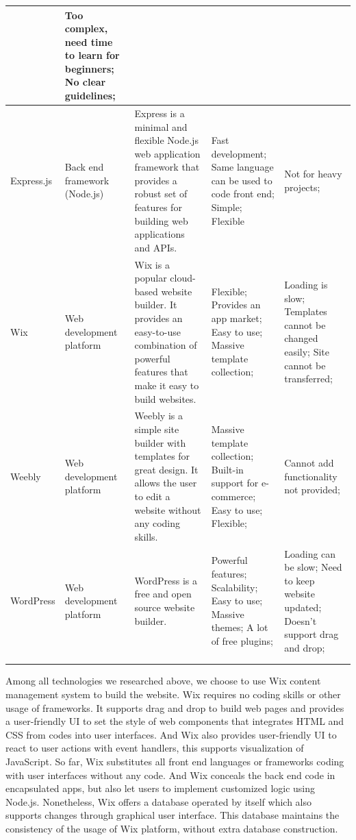 \documentclass{report}
\begin{document}
\begin{tabularx}{0.95\linewidth}{%
  >{\raggedright\arraybackslash}p{1.5cm}%
  >{\raggedright\arraybackslash}p{1.8cm}%
  >{\raggedright\arraybackslash}X%
  >{\raggedright\arraybackslash}X%
  >{\raggedright\arraybackslash}X}
  & Too complex, need time to learn for beginners; No clear guidelines;
  \\
  \midrule
  Express.js
  & Back end framework (Node.js)
  & Express is a minimal and flexible Node.js web application framework that provides a robust set of features for building web applications and APIs.
  & Fast development; Same language can be used to code front end; Simple; Flexible
  & Not for heavy projects;
  \\
  \midrule
  Wix
  & Web development platform
  & Wix is a popular cloud-based website builder. It provides an easy-to-use combination of powerful features that make it easy to build websites.
  & Flexible; Provides an app market; Easy to use; Massive template collection;
  & Loading is slow; Templates cannot be changed easily; Site cannot be transferred;
  \\
  \midrule
  Weebly
  & Web development platform
  & Weebly is a simple site builder with templates for great design. It allows the user to edit a website without any coding skills.
  & Massive template collection; Built-in support for e-commerce; Easy to use; Flexible;
  & Cannot add functionality not provided;
  \\
  \midrule
  WordPress
  & Web development platform
  & WordPress is a free and open source website builder. 
  & Powerful features; Scalability; Easy to use; Massive themes; A lot of free plugins;
  & Loading can be slow; Need to keep website updated; Doesn't support drag and drop;
  \\
  \bottomrule
  \\
  \caption{Available Web Development Technologies}  
  \label{tab:availableWebDevelopmentTechnologies}
\end{tabularx}
Among all technologies we researched above, we choose to use Wix content management system to build the website. Wix requires no coding skills or other usage of frameworks. It supports drag and drop to build web pages and provides a user-friendly UI to set the style of web components that integrates HTML and CSS from codes into user interfaces. And Wix also provides user-friendly UI to react to user actions with event handlers, this supports visualization of JavaScript. So far, Wix substitutes all front end languages or frameworks coding with user interfaces without any code. And Wix conceals the back end code in encapsulated apps, but also let users to implement customized logic using Node.js. Nonetheless, Wix offers a database operated by itself which also supports changes through graphical user interface. This database maintains the consistency of the usage of Wix platform, without extra database construction.
\end{document}
